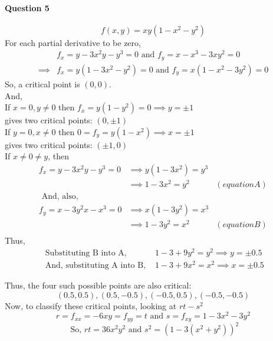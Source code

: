 \documentclass[20pt,a4paper]{extarticle} %
\theoremstyle{definition}
\theoremstyle{definition}
\begin{document}
\paragraph{Question 5}
\[ f(x,y)=xy(1-x^2-y^2) \]
For each partial derivative to be zero,
\begin{align*}
	& f_x=y-3x^2y-y^3=0 \text{ and }f_y=x-x^3-3xy^2=0 \\
	\implies & f_x=y(1-3x^2-y^2)=0 \text{ and } f_y=x(1-x^2-3y^2)=0
\end{align*}
So, a critical point is $(0,0)$.\\

And,\\
If $x=0,y\neq0$ then $f_x=y(1-y^2)=0 \implies y= \pm 1$\\
gives two critical points: $(0,\pm 1)$\\

If $y=0,x\neq0$ then $0=f_y=y(1-x^2) \implies x= \pm 1$ \\
gives two critical points: $(\pm 1,0)$\\

If $x\neq 0 \neq y$, then \\
\begin{align*}
	f_x=y-3x^2y-y^3=0 & \implies y(1-3x^2)=y^3 &\\
			  & \implies 1-3x^2=y^2 &(equation A)\\
	\text{ And, also, } & &\\
	f_y=x-3y^2x-x^3=0 & \implies x(1-3y^2)=x^3 &\\
			  & \implies 1-3y^2=x^2 &(equation B)\\
\end{align*}
Thus,
\begin{align*}
	\text{ Substituting B into A, } & 1-3+9y^2=y^2 \implies y = \pm 0.5 \\
	\text{ And, substituting A into B, } & 1-3+9x^2=x^2 \implies x = \pm 0.5
\end{align*}

Thus, the four such possible points are also critical:
\[(0.5,0.5),(0.5,-0.5),(-0.5,0.5),(-0.5,-0.5)\]
Now, to classify these critical points, looking at $rt-s^2$
\[ r=f_{xx}=-6xy=f_{yy}=t \text{ and } s=f_{xy}=1-3x^2-3y^2 \]
\[ \text{ So, } rt=36x^2y^2 \text{ and } s^2= (1-3(x^2+y^2))^2 \]
\end{document}
